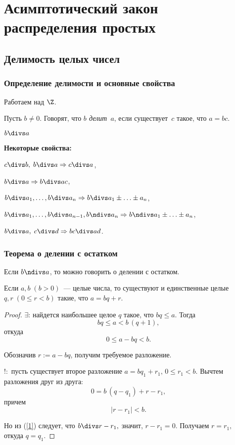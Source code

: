 \section{Асимптотический закон распределения простых }
\subsection{Делимость целых чисел}
\subsubsection{Определение делимости и основные свойства}

Работаем над $\Z$.
\begin{df}
  Пусть $b\neq0$. Говорят, что \textit{$b$ делит~$a$}, если существует~$c$ такое, что $a = bc$.
\end{df}
\begin{denote}
  $b\divs a$
\end{denote}

\textbf{Некоторые свойства:}
\begin{points}{0}
  \item $c \divs b,\;b\divs a \Rightarrow c\divs a$,
  \item $b \divs a\Rightarrow b\divs ac$,
  \item $b \divs a_1,\ldots,b \divs a_n \Rightarrow b \divs a_1\pm\ldots\pm a_n$,
  \item $b \divs a_1,\ldots,b \divs a_{n-1},b \ndivs a_n \Rightarrow b \ndivs a_1\pm\ldots\pm a_n$,
  \item $b \divs a,\;c \divs d \Rightarrow bc \divs ad$.
\end{points}

\subsubsection{Теорема о делении с остатком}

Если $b\ndivs a$, то можно говорить о делении с остатком.
\begin{theorem}
  Если $a,b\;(b>0)$~--- целые числа, то существуют и единственные целые 
	$q,r\;(0\leqslant r<b)$ такие, что $a=bq+r$.
\end{theorem}
\begin{proof}
  $\exists$: найдется наибольшее целое $q$ такое, что $bq\le a$. Тогда
  $$
    bq\le a<b\,(q+1),
  $$
  откуда
  $$
    0\le a-bq<b.
  $$

  Обозначив $r:=a-bq$, получим требуемое разложение.

  $!:$ пусть существует второе разложение $a=bq_1+r_1,\,0\le r_1<b.$ Вычтем разложения друг из друга:
  \begin{equation}
    \label{1}
    0=b\,(q-q_1)+r-r_1,
  \end{equation}
  причем
  $$
    |r-r_1|<b.
  $$

  Но из (\ref{1}) следует, что $b\divs r-r_1,$ значит, $r-r_1=0$. Получаем $r=r_1,$ откуда $q=q_1$.
\end{proof}

